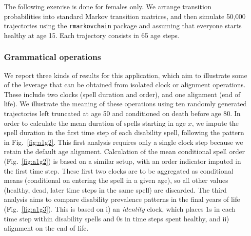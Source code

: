 \documentclass{article}
\begin{document}
The following exercise is done for females only. We arrange transition probabilities into standard Markov transition matrices, and then simulate 50,000 trajectories using the \texttt{rmarkovchain} package \citep{spedicato2017} and assuming that everyone starts healthy at age 15. Each trajectory consists in 65 age steps.



\subsubsection{Grammatical operations}
We report three kinds of results for this application, which aim to illustrate some of the leverage that can be obtained from isolated clock or alignment operations. These include two clocks (spell duration and order), and one alignment (end of life). We illustrate the meaning of these operations using ten randomly generated trajectories left truncated at age 50 and conditioned on death before age 80. In order to calculate the mean duration of spells starting in age $x$, we impute the spell duration in the first time step of each disability spell, following the pattern in Fig.~\ref{fig:a1g2}. This first analysis requires only a single clock step because we retain the default age alignment. Calculation of the mean conditional spell order (Fig.~\ref{fig:a1g2}) is based on a similar setup, with an order indicator imputed in the first time step. These first two clocks are to be aggregated as conditional means (conditional on entering the spell in a given age), so all other values (healthy, dead, later time steps in the same spell) are discarded. The third analysis aims to compare disability prevalence patterns in the final years of life (Fig.~\ref{fig:a1g3}). This is based on i) an \emph{identity} clock, which places 1s in each time step within disability spells and 0s in time steps spent healthy, and ii) alignment on the end of life.
\end{document}
